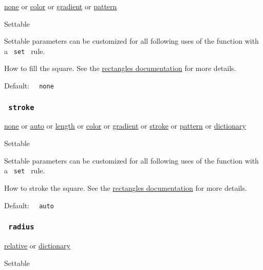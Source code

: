 \href{/docs/reference/foundations/none/}{none} {or}
\href{/docs/reference/visualize/color/}{color} {or}
\href{/docs/reference/visualize/gradient/}{gradient} {or}
\href{/docs/reference/visualize/pattern/}{pattern}

{{ Settable }}

\label{parameters-fill-settable-tooltip}
Settable parameters can be customized for all following uses of the
function with a \texttt{\ set\ } rule.

How to fill the square. See the
\href{/docs/reference/visualize/rect/\#parameters-fill}{rectangle\textquotesingle s
documentation} for more details.

Default: \texttt{\ }{\texttt{\ none\ }}\texttt{\ }

\subsubsection{\texorpdfstring{\texttt{\ stroke\ }}{ stroke }}\label{parameters-stroke}

\href{/docs/reference/foundations/none/}{none} {or}
\href{/docs/reference/foundations/auto/}{auto} {or}
\href{/docs/reference/layout/length/}{length} {or}
\href{/docs/reference/visualize/color/}{color} {or}
\href{/docs/reference/visualize/gradient/}{gradient} {or}
\href{/docs/reference/visualize/stroke/}{stroke} {or}
\href{/docs/reference/visualize/pattern/}{pattern} {or}
\href{/docs/reference/foundations/dictionary/}{dictionary}

{{ Settable }}

\label{parameters-stroke-settable-tooltip}
Settable parameters can be customized for all following uses of the
function with a \texttt{\ set\ } rule.

How to stroke the square. See the
\href{/docs/reference/visualize/rect/\#parameters-stroke}{rectangle\textquotesingle s
documentation} for more details.

Default: \texttt{\ }{\texttt{\ auto\ }}\texttt{\ }

\subsubsection{\texorpdfstring{\texttt{\ radius\ }}{ radius }}\label{parameters-radius}

\href{/docs/reference/layout/relative/}{relative} {or}
\href{/docs/reference/foundations/dictionary/}{dictionary}

{{ Settable }}

